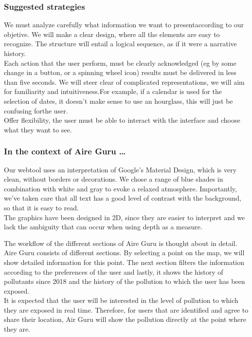 \subsubsection*{Suggested strategies} 

We must analyze carefully what information we want to presentaccording to our objetive. We will make a clear design, where all the elements are easy to recognize.
The structure will entail a logical sequence, as if it were a narrative history.\\

Each action that the user perform, must be clearly acknowledged (eg by some change in a button, or a spinning wheel icon) results must be delivered in less than five seconds.
We will steer clear of complicated representations, we will aim for familiarity and intuitiveness.For example, if a calendar is used for the selection of dates, it doesn't 
make sense to use an hourglass, this will just be confusing forthe user.\\

Offer flexibility, the user must be able to interact with the interface and choose what they want to see.

\subsubsection*{In the context of Aire Guru \ldots}

Our webtool uses an interpretation of Google's Material Design, which is very clean, without borders or decorations.
We chose a range of blue shades in combination with white and gray to evoke a relaxed atmosphere.
Importantly, we've taken care that all text has a good level of contrast with the background, so that it is easy to read.\\

The graphics have been designed in 2D, since they are easier to interpret and we lack the ambiguity that can occur when using depth as a measure.

The workflow of the different sections of Aire Guru is thought about in detail.
Aire Guru consists of different sections. By selecting a point on the map, we
will show detailed information for this point. The next section filters the information according to the preferences of the user
and lastly, it shows the history of pollutants since 2018 and the history of the pollution to which the user has been
exposed.\\

It is expected that the user will be interested in the level of pollution to which they are exposed in real time. Therefore, for users
that are identified and agree to share their location, Air Guru will show the pollution directly at the point where they are.\\

